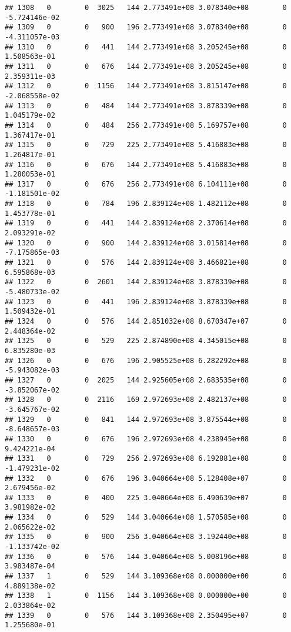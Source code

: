 \documentclass[
]{article}
\begin{document}
\begin{enumerate}
\begin{verbatim}
## 1308   0        0  3025   144 2.773491e+08 3.078340e+08        0 -5.724146e-02
## 1309   0        0   900   196 2.773491e+08 3.078340e+08        0 -4.311057e-03
## 1310   0        0   441   144 2.773491e+08 3.205245e+08        0  1.508563e-01
## 1311   0        0   676   144 2.773491e+08 3.205245e+08        0  2.359311e-03
## 1312   0        0  1156   144 2.773491e+08 3.815147e+08        0 -2.068558e-02
## 1313   0        0   484   144 2.773491e+08 3.878339e+08        0  1.045179e-02
## 1314   0        0   484   256 2.773491e+08 5.169757e+08        0  1.367417e-01
## 1315   0        0   729   225 2.773491e+08 5.416883e+08        0  1.264817e-01
## 1316   0        0   676   144 2.773491e+08 5.416883e+08        0  1.280053e-01
## 1317   0        0   676   256 2.773491e+08 6.104111e+08        0 -1.181501e-02
## 1318   0        0   784   196 2.839124e+08 1.482112e+08        0  1.453778e-01
## 1319   0        0   441   144 2.839124e+08 2.370614e+08        0  2.093291e-02
## 1320   0        0   900   144 2.839124e+08 3.015814e+08        0 -7.175865e-03
## 1321   0        0   576   144 2.839124e+08 3.466821e+08        0  6.595868e-03
## 1322   0        0  2601   144 2.839124e+08 3.878339e+08        0 -5.480733e-02
## 1323   0        0   441   196 2.839124e+08 3.878339e+08        0  1.509432e-01
## 1324   0        0   576   144 2.851032e+08 8.670347e+07        0  2.448364e-02
## 1325   0        0   529   225 2.874890e+08 4.345015e+08        0  6.835280e-03
## 1326   0        0   676   196 2.905525e+08 6.282292e+08        0 -5.943082e-03
## 1327   0        0  2025   144 2.925605e+08 2.683535e+08        0 -3.852067e-02
## 1328   0        0  2116   169 2.972693e+08 2.482137e+08        0 -3.645767e-02
## 1329   0        0   841   144 2.972693e+08 3.875544e+08        0 -8.648657e-03
## 1330   0        0   676   196 2.972693e+08 4.238945e+08        0  9.424221e-04
## 1331   0        0   729   256 2.972693e+08 6.192881e+08        0 -1.479231e-02
## 1332   0        0   676   196 3.040664e+08 5.128408e+07        0  2.679456e-02
## 1333   0        0   400   225 3.040664e+08 6.490639e+07        0  3.981982e-02
## 1334   0        0   529   144 3.040664e+08 1.570585e+08        0  2.065622e-02
## 1335   0        0   900   256 3.040664e+08 3.192440e+08        0 -1.133742e-02
## 1336   0        0   576   144 3.040664e+08 5.008196e+08        0  3.983487e-04
## 1337   1        0   529   144 3.109368e+08 0.000000e+00        0  4.889138e-02
## 1338   1        0  1156   144 3.109368e+08 0.000000e+00        0  2.033864e-02
## 1339   0        0   576   144 3.109368e+08 2.350495e+07        0  1.255680e-01

\end{verbatim}
\end{enumerate}
\end{document}
